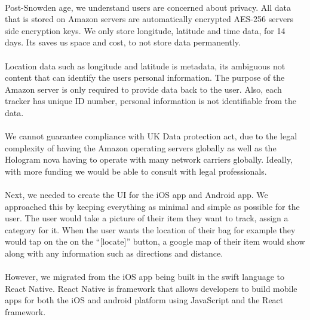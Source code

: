 \documentclass[12pt,a4paper]{article}
\begin{document}
        \paragraph{} Post-Snowden age, we understand users are concerned about privacy. All data that is stored on Amazon servers are automatically encrypted AES-256 servers side encryption keys. We only store longitude, latitude and time data, for 14 days. Its saves us space and cost, to not store data permanently.
        
        \paragraph{} Location data such as longitude and latitude is metadata, its ambiguous not content that can identify the users personal information. The purpose of the Amazon server is only required to provide data back to the user. Also, each tracker has unique ID number, personal information is not identifiable from the data. 
        
        \paragraph{} We cannot guarantee compliance with UK Data protection act, due to the legal complexity of having the Amazon operating servers globally as well as the Hologram nova having to operate with many network carriers globally. Ideally, with more funding we would be able to consult with legal professionals. 
        
        \paragraph{} Next, we needed to create the UI for the iOS app and Android app. We approached this by keeping everything as minimal and simple as possible for the user. The user would take a picture of their item they want to track, assign a category for it. When the user wants the location of their bag for example they would tap on the on the “[locate]” button, a google map of their item would show along with any information such as directions and distance. 
        
        \paragraph{} However, we migrated from the iOS app being built in the swift language to React Native. React Native is framework that allows developers to build mobile apps for both the iOS and android platform using JavaScript and the React framework. 
        
\end{document}
